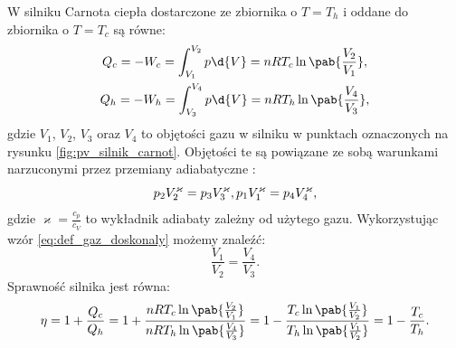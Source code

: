 W silniku Carnota ciepła dostarczone ze zbiornika o \(T = T_h\) i oddane do zbiornika o \(T = T_c\) są równe:
\begin{gather*}
	Q_c = - W_c = \int_{V_1}^{V_2} p \d{V} = nRT_c \ln\pab{\frac{V_2}{V_1}}, \\
	Q_h = - W_h = \int_{V_3}^{V_4} p \d{V} = nRT_h \ln\pab{\frac{V_4}{V_3}},
\end{gather*}
gdzie \(V_1\), \(V_2\), \(V_3\) oraz \(V_4\) to objętości gazu w silniku w punktach oznaczonych na rysunku \ref{fig:pv_silnik_carnot}. Objętości te są powiązane ze sobą warunkami narzuconymi przez przemiany adiabatyczne \cite{b:pudlik_termodynamika}:
\begin{equation*}
	p_{2}V_{2}^{\varkappa} = p_{3}V_{3}^{\varkappa}, \\
	p_{1}V_{1}^{\varkappa} = p_{4}V_{4}^{\varkappa},
\end{equation*}
gdzie \(\varkappa = \frac{c_p}{c_V}\) to wykładnik adiabaty zależny od użytego gazu. Wykorzystując wzór \eqref{eq:def_gaz_doskonaly} możemy znaleźć:
\begin{equation*}
	\frac{V_1}{V_2} = \frac{V_4}{V_3}.
\end{equation*}
Sprawność silnika jest równa:
\begin{equation}\label{eq:sprawnosc_silnika_Carnota}
	\eta = 1 + \frac{Q_c}{Q_h} =
	1 + \frac{nRT_c \ln\pab{\frac{V_2}{V_1}}}{nRT_h \ln\pab{\frac{V_4}{V_3}}} =
	1 - \frac{T_c \ln\pab{\frac{V_1}{V_2}}}{T_h \ln\pab{\frac{V_1}{V_2}}} =
	1 - \frac{T_c}{T_h}.
\end{equation}


